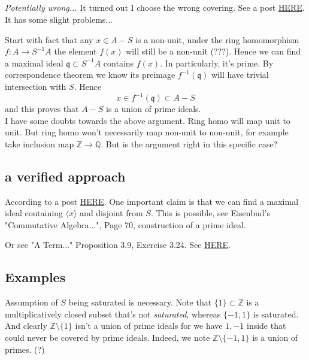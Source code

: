 \subsection{}
\textit{Potentially wrong...}
It turned out I choose the wrong covering. See a post \href{https://math.stackexchange.com/questions/3988316/proof-verification-atiyah-macdonald-exercise-3-7i}{HERE}. It has some slight problems...

Start with fact that any $x\in A-S$ is a non-unit, under the ring homomorphism $f:A\to S^{-1}A$ the element $f(x)$ will still be a non-unit (???). Hence we can find a maximal ideal $\mathfrak q\subset S^{-1}A$ contains $f(x)$. In particularly, it's prime. By correspondence theorem we know its preimage $f^{-1}(\mathfrak q)$ will have trivial intersection with $S$. Hence 
$$x\in f^{-1}(\mathfrak q)\subset A-S$$ and this proves that $A-S$ is a union of prime ideals.\\

I have some doubts towards the above argument. Ring homo will map unit to unit. But ring homo won't necessarily map non-unit to non-unit, for example take inclusion map $\mathbb Z\to \mathbb Q$. 
But is the argument right in this specific case?

\subsection{a verified approach}

According to a post \href{https://math.stackexchange.com/questions/57684/complement-of-saturated-set}{HERE}. One important claim is that we can find a maximal ideal containing $\langle x\rangle$ and disjoint from $S$. This is possible, see Eisenbud's "Commutative Algebra...", Page 70, construction of a prime ideal.

Or see "A Term..." Proposition 3.9, Exercise 3.24. See \href{https://math.stackexchange.com/questions/4329999/saturated-set-and-union-of-prime-ideals}{HERE}. 

\subsection{Examples}

Assumption of $S$ being saturated is necessary. Note that $\{1\}\subset \mathbb Z$ is a multiplicatively closed subset that's not \textit{saturated}, whereas $\{-1,1\}$ is saturated. And clearly $\mathbb Z\setminus \{1\}$ isn't a union of prime ideals for we have $1,-1$ inside that could never be covered by prime ideals. Indeed, we note $\mathbb Z\setminus \{-1,1\}$ is a union of primes. (?) 

